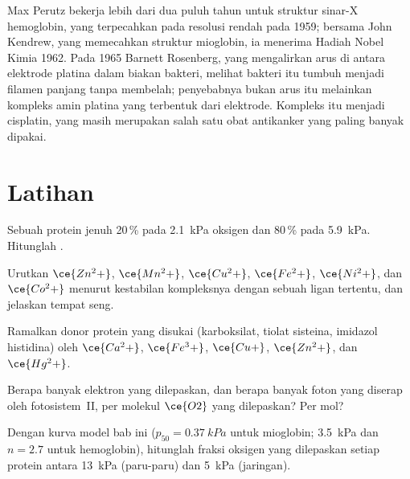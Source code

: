 \begin{history}
Max Perutz bekerja lebih dari dua puluh tahun untuk struktur sinar-X
hemoglobin, yang terpecahkan pada resolusi rendah pada 1959; bersama John Kendrew, yang memecahkan struktur
mioglobin, ia menerima Hadiah Nobel Kimia 1962. Pada 1965 Barnett
Rosenberg, yang mengalirkan arus di antara elektrode platina dalam biakan
bakteri, melihat bakteri itu tumbuh menjadi filamen panjang tanpa membelah; penyebabnya
bukan arus itu melainkan kompleks amin platina yang terbentuk dari elektrode. Kompleks itu
menjadi cisplatin, yang masih merupakan salah satu obat antikanker yang paling banyak dipakai.
\end{history}

\section{Latihan}

\begin{exercise}[$\star$]\label{exo:b3:bioinorganic:1}
Sebuah protein jenuh 20\,\% pada \qty{2.1}{kPa} oksigen dan 80\,\% pada \qty{5.9}{kPa}. Hitunglah
.
\end{exercise}

\begin{exercise}[$\star$]\label{exo:b3:bioinorganic:2}
Urutkan $\ce{Zn^2+}$, $\ce{Mn^2+}$, $\ce{Cu^2+}$, $\ce{Fe^2+}$, $\ce{Ni^2+}$, dan $\ce{Co^2+}$ menurut kestabilan kompleksnya dengan
sebuah ligan tertentu, dan jelaskan tempat seng.
\end{exercise}

\begin{exercise}[$\star$]\label{exo:b3:bioinorganic:3}
Ramalkan donor protein yang disukai (karboksilat, tiolat sisteina,
imidazol histidina) oleh $\ce{Ca^2+}$, $\ce{Fe^3+}$, $\ce{Cu+}$, $\ce{Zn^2+}$, dan $\ce{Hg^2+}$.
\end{exercise}

\begin{exercise}[$\star$]\label{exo:b3:bioinorganic:4}
Berapa banyak elektron yang dilepaskan, dan berapa banyak foton yang diserap oleh fotosistem~II,
per molekul $\ce{O2}$ yang dilepaskan? Per mol?
\end{exercise}

\begin{exercise}[$\star\star$]\label{exo:b3:bioinorganic:5}
Dengan kurva model bab ini ($p_{50} = \qty{0.37}{kPa}$ untuk mioglobin; \qty{3.5}{kPa} dan $n = 2.7$ untuk
hemoglobin), hitunglah fraksi oksigen yang dilepaskan setiap protein antara
\qty{13}{kPa} (paru-paru) dan \qty{5}{kPa} (jaringan).
\end{exercise}

